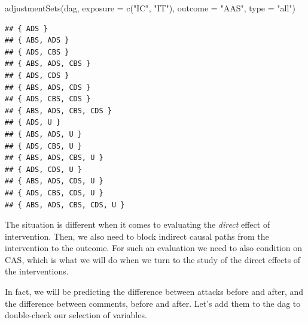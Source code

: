 \documentclass[
  10pt,
  dvipsnames,enabledeprecatedfontcommands]{scrartcl}
\newenvironment{Shaded}{\begin{snugshade}}{\end{snugshade}}
\newcommand{\AttributeTok}[1]{\textcolor[rgb]{0.77,0.63,0.00}{#1}}
\newcommand{\FunctionTok}[1]{\textcolor[rgb]{0.00,0.00,0.00}{#1}}
\newcommand{\NormalTok}[1]{#1}
\newcommand{\StringTok}[1]{\textcolor[rgb]{0.31,0.60,0.02}{#1}}
\begin{document}
\vspace{1mm}
\footnotesize

\begin{Shaded}
\begin{Highlighting}[]
\FunctionTok{adjustmentSets}\NormalTok{(dag, }\AttributeTok{exposure =} \FunctionTok{c}\NormalTok{(}\StringTok{"IC"}\NormalTok{, }\StringTok{"IT"}\NormalTok{), }\AttributeTok{outcome =} \StringTok{"AAS"}\NormalTok{, }\AttributeTok{type =} \StringTok{"all"}\NormalTok{)}
\end{Highlighting}
\end{Shaded}

\begin{verbatim}
## { ADS }
## { ABS, ADS }
## { ADS, CBS }
## { ABS, ADS, CBS }
## { ADS, CDS }
## { ABS, ADS, CDS }
## { ADS, CBS, CDS }
## { ABS, ADS, CBS, CDS }
## { ADS, U }
## { ABS, ADS, U }
## { ADS, CBS, U }
## { ABS, ADS, CBS, U }
## { ADS, CDS, U }
## { ABS, ADS, CDS, U }
## { ADS, CBS, CDS, U }
## { ABS, ADS, CBS, CDS, U }
\end{verbatim}

\normalsize

The situation is different when it comes to evaluating the \emph{direct}
effect of intervention. Then, we also need to block indirect causal
paths from the intervention to the outcome. For such an evaluation we
need to also condition on \textsf{CAS}, which is what we will do when we
turn to the study of the direct effects of the interventions.

In fact, we will be predicting the difference between attacks before and
after, and the difference between comments, before and after. Let's add
them to the dag to double-check our selection of variables.
\end{document}
